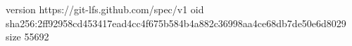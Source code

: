 version https://git-lfs.github.com/spec/v1
oid sha256:2ff92958cd453417ead4cc4f675b584b4a882c36998aa4ce68db7de50e6d8029
size 55692
